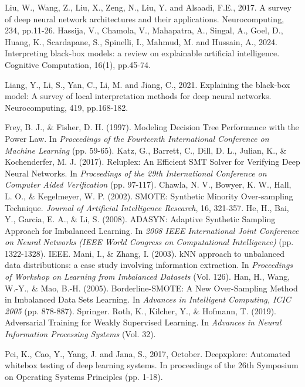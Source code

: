 \begin{singlespace}
\begin{thebibliography}{}
    Liu, W., Wang, Z., Liu, X., Zeng, N., Liu, Y. and Alsaadi, F.E., 2017. A survey of deep neural network architectures and their applications. Neurocomputing, 234, pp.11-26.
    Hassija, V., Chamola, V., Mahapatra, A., Singal, A., Goel, D., Huang, K., Scardapane, S., Spinelli, I., Mahmud, M. and Hussain, A., 2024. Interpreting black-box models: a review on explainable artificial intelligence. Cognitive Computation, 16(1), pp.45-74.

     Liang, Y., Li, S., Yan, C., Li, M. and Jiang, C., 2021. Explaining the black-box model: A survey of local interpretation methods for deep neural networks. Neurocomputing, 419, pp.168-182.
   

     Frey, B. J., \& Fisher, D. H. (1997). Modeling Decision Tree Performance with the Power Law. In \textit{Proceedings of the Fourteenth International Conference on Machine Learning} (pp. 59-65).
     Katz, G., Barrett, C., Dill, D. L., Julian, K., \& Kochenderfer, M. J. (2017). Reluplex: An Efficient SMT Solver for Verifying Deep Neural Networks. In \textit{Proceedings of the 29th International Conference on Computer Aided Verification} (pp. 97-117).
     Chawla, N. V., Bowyer, K. W., Hall, L. O., \& Kegelmeyer, W. P. (2002). SMOTE: Synthetic Minority Over-sampling Technique. \textit{Journal of Artificial Intelligence Research}, 16, 321-357.
     He, H., Bai, Y., Garcia, E. A., \& Li, S. (2008). ADASYN: Adaptive Synthetic Sampling Approach for Imbalanced Learning. In \textit{2008 IEEE International Joint Conference on Neural Networks (IEEE World Congress on Computational Intelligence)} (pp. 1322-1328). IEEE.
     Mani, I., \& Zhang, I. (2003). kNN approach to unbalanced data distributions: a case study involving information extraction. In \textit{Proceedings of Workshop on Learning from Imbalanced Datasets} (Vol. 126).
     Han, H., Wang, W.-Y., \& Mao, B.-H. (2005). Borderline-SMOTE: A New Over-Sampling Method in Imbalanced Data Sets Learning. In \textit{Advances in Intelligent Computing, ICIC 2005} (pp. 878-887). Springer.
     Roth, K., Kilcher, Y., \& Hofmann, T. (2019). Adversarial Training for Weakly Supervised Learning. In \textit{Advances in Neural Information Processing Systems} (Vol. 32).


   
    
     Pei, K., Cao, Y., Yang, J. and Jana, S., 2017, October. Deepxplore: Automated whitebox testing of deep learning systems. In proceedings of the 26th Symposium on Operating Systems Principles (pp. 1-18).


\end{thebibliography}
\end{singlespace}
